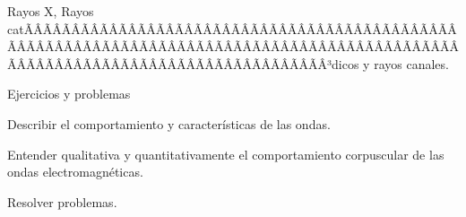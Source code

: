 \begin{sumilla}
\begin{unit}
\begin{topicos}
      \item Rayos X, Rayos catÃÂÃÂÃÂÃÂÃÂÃÂÃÂÃÂÃÂÃÂÃÂÃÂÃÂÃÂÃÂÃÂÃÂÃÂÃÂÃÂÃÂÃÂÃÂÃÂÃÂÃÂÃÂÃÂÃÂÃÂÃÂÃÂÃÂÃÂÃÂÃÂÃÂÃÂÃÂÃÂÃÂÃÂÃÂÃÂÃÂÃÂÃÂÃÂÃÂÃÂÃÂÃÂÃÂÃÂÃÂÃÂÃÂÃÂÃÂÃÂÃÂÃÂÃÂÃÂ³dicos y rayos canales.
      \item Ejercicios y problemas
\end{topicos}

   \begin{objetivos}
      \item Describir el comportamiento y caracter\'isticas de las ondas.
      \item Entender qualitativa y quantitativamente el comportamiento corpuscular de las ondas electromagn\'eticas.
      \item Resolver problemas.
   \end{objetivos}
\end{unit}


\end{sumilla}
